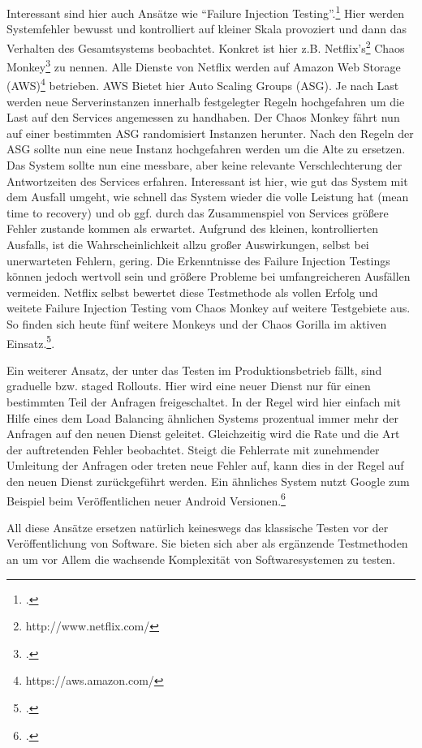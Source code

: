 Interessant sind hier auch Ansätze wie ``Failure Injection Testing''.\footcite[][]{netflix:fit} Hier werden Systemfehler bewusst und kontrolliert auf kleiner Skala provoziert und dann das Verhalten des Gesamtsystems beobachtet. Konkret ist hier z.B. Netflix's\footnote{http://www.netflix.com/} Chaos Monkey\footcite[][]{netflix:chaosmonkey} zu nennen. Alle Dienste von Netflix werden auf Amazon Web Storage (AWS)\footnote{https://aws.amazon.com/} betrieben. AWS Bietet hier Auto Scaling Groups (ASG). Je nach Last werden neue Serverinstanzen innerhalb festgelegter Regeln hochgefahren um die Last auf den Services angemessen zu handhaben. Der Chaos Monkey fährt nun auf einer bestimmten ASG randomisiert Instanzen herunter. Nach den Regeln der ASG sollte nun eine neue Instanz hochgefahren werden um die Alte zu ersetzen. Das System sollte nun eine messbare, aber keine relevante Verschlechterung der Antwortzeiten des Services erfahren. Interessant ist hier, wie gut das System mit dem Ausfall umgeht, wie schnell das System wieder die volle Leistung hat (mean time to recovery) und ob ggf. durch das Zusammenspiel von Services größere Fehler zustande kommen als erwartet. Aufgrund des kleinen, kontrollierten Ausfalls, ist die Wahrscheinlichkeit allzu großer Auswirkungen, selbst bei unerwarteten Fehlern, gering. Die Erkenntnisse des Failure Injection Testings können jedoch wertvoll sein und größere Probleme bei umfangreicheren Ausfällen vermeiden. Netflix selbst bewertet diese Testmethode als vollen Erfolg und weitete Failure Injection Testing vom Chaos Monkey auf weitere Testgebiete aus. So finden sich heute fünf weitere Monkeys und der Chaos Gorilla im aktiven Einsatz.\footcite[][]{netflix:army}.

Ein weiterer Ansatz, der unter das Testen im Produktionsbetrieb fällt, sind graduelle bzw. staged Rollouts. Hier wird eine neuer Dienst nur für einen bestimmten Teil der Anfragen freigeschaltet. In der Regel wird hier einfach mit Hilfe eines dem Load Balancing ähnlichen Systems prozentual immer mehr der Anfragen auf den neuen Dienst geleitet. Gleichzeitig wird die Rate und die Art der auftretenden Fehler beobachtet. Steigt die Fehlerrate mit zunehmender Umleitung der Anfragen oder treten neue Fehler auf, kann dies in der Regel auf den neuen Dienst zurückgeführt werden. Ein ähnliches System nutzt Google zum Beispiel beim Veröffentlichen neuer Android Versionen.\footcite[vgl.][]{Google:staged}

All diese Ansätze ersetzen natürlich keineswegs das klassische Testen vor der Veröffentlichung von Software. Sie bieten sich aber als ergänzende Testmethoden an um vor Allem die wachsende Komplexität von Softwaresystemen zu testen.

